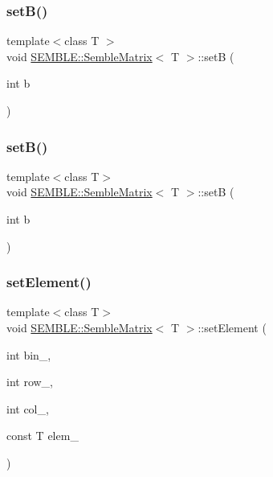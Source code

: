 \mbox{\label{structSEMBLE_1_1SembleMatrix_a3efa5315ec7e5fd9491e5904479c82ec}} 
\subsubsection{\texorpdfstring{setB()}{setB()}\hspace{0.1cm}{\footnotesize\ttfamily [1/2]}}
{\footnotesize\ttfamily template$<$class T $>$ \\
void \mbox{\hyperlink{structSEMBLE_1_1SembleMatrix}{S\+E\+M\+B\+L\+E\+::\+Semble\+Matrix}}$<$ T $>$\+::setB (\begin{DoxyParamCaption}\item[{int}]{b }\end{DoxyParamCaption})}

\mbox{\label{structSEMBLE_1_1SembleMatrix_a3efa5315ec7e5fd9491e5904479c82ec}} 
\subsubsection{\texorpdfstring{setB()}{setB()}\hspace{0.1cm}{\footnotesize\ttfamily [2/2]}}
{\footnotesize\ttfamily template$<$class T$>$ \\
void \mbox{\hyperlink{structSEMBLE_1_1SembleMatrix}{S\+E\+M\+B\+L\+E\+::\+Semble\+Matrix}}$<$ T $>$\+::setB (\begin{DoxyParamCaption}\item[{int}]{b }\end{DoxyParamCaption})}

\mbox{\label{structSEMBLE_1_1SembleMatrix_a1b68e0d33a0d6699d94590135e3f4163}} 
\subsubsection{\texorpdfstring{setElement()}{setElement()}\hspace{0.1cm}{\footnotesize\ttfamily [1/4]}}
{\footnotesize\ttfamily template$<$class T$>$ \\
void \mbox{\hyperlink{structSEMBLE_1_1SembleMatrix}{S\+E\+M\+B\+L\+E\+::\+Semble\+Matrix}}$<$ T $>$\+::set\+Element (\begin{DoxyParamCaption}\item[{int}]{bin\+\_\+,  }\item[{int}]{row\+\_\+,  }\item[{int}]{col\+\_\+,  }\item[{const T}]{elem\+\_\+ }\end{DoxyParamCaption})}

